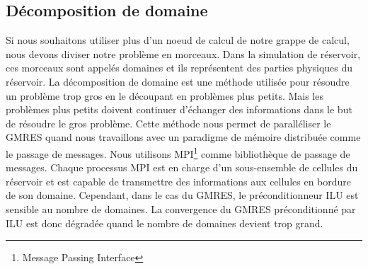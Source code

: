\subsection{Décomposition de domaine}
Si nous souhaitons utiliser plus d'un noeud de calcul de notre grappe de calcul, nous devons diviser notre problème en morceaux.
%
Dans la simulation de réservoir, ces morceaux sont appelés domaines et ils représentent des parties physiques du réservoir.
%
La décomposition de domaine est une méthode utilisée pour résoudre un problème trop gros en le découpant en problèmes plus petits.
%
Mais les problèmes plus petits doivent continuer d'échanger des informations dans le but de résoudre le gros problème.
%
Cette méthode nous permet de paralléliser le GMRES quand nous travaillons avec un paradigme de mémoire distribuée comme le passage de messages.
%
Nous utilisons MPI\footnote{Message Passing Interface} comme bibliothèque de passage de messages.
%
Chaque processus MPI est en charge d'un sous-ensemble de cellules du réservoir et est capable de transmettre des informations aux cellules en bordure de son domaine.
%
Cependant, dans le cas du GMRES, le préconditionneur ILU est sensible au nombre de domaines.
%
La convergence du GMRES préconditionné par ILU est donc dégradée quand le nombre de domaines devient trop grand.
